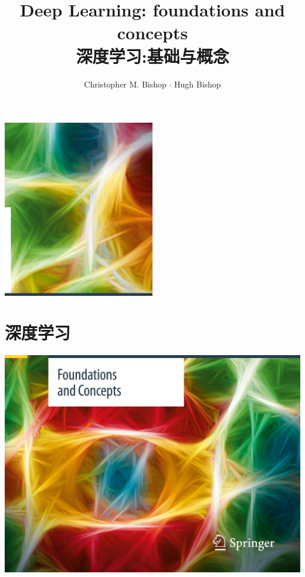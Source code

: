 \documentclass[10pt]{article}
\title{Deep Learning: foundations and concepts \\ 深度学习:基础与概念}
\author{Christopher M. Bishop \(\cdot\) Hugh Bishop}
\begin{document}
\maketitle
\begin{center}
	\includegraphics[max width=0.5\textwidth]{images/0194e279-9b28-703a-88f4-c3ac21e2010d_0_968_0_675_789_0.jpg}
\end{center}

\tableofcontents



\hspace*{3em} 

\section*{深度学习}

\begin{center}
\includegraphics[max width=1.0\textwidth]{images/0194e279-9b28-703a-88f4-c3ac21e2010d_0_0_1124_1643_1207_0.jpg}
\end{center}
\hspace*{3em} 
\end{document}
